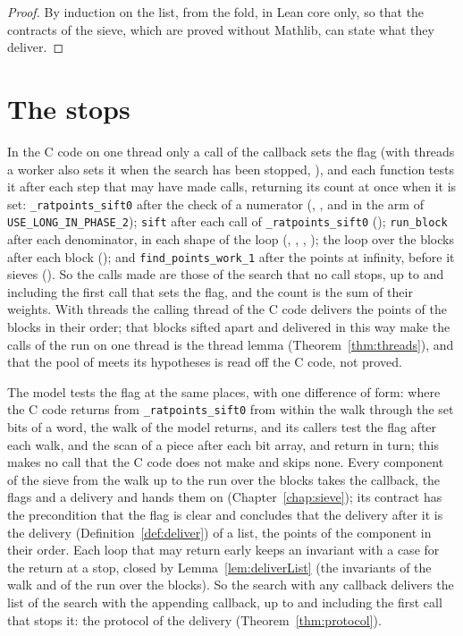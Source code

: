 \begin{proof}
  \leanok
  By induction on the list, from the fold, in Lean core only, so that the contracts of the sieve,
  which are proved without Mathlib, can state what they deliver.
\end{proof}

\section{The stops}\label{sec:outputStops}

In the C code on one thread only a call of the callback sets the flag (with threads a worker also
sets it when the search has been stopped, ), and each function
tests it after each step that may have made calls, returning its count at once when it is set:
\verb|_ratpoints_sift0| after the check of a numerator (,
, and  in the arm of
\verb|USE_LONG_IN_PHASE_2|); \verb|sift| after each call of \verb|_ratpoints_sift0|
(); \verb|run_block| after each denominator, in each shape of the
loop (, ,
, ); the loop over the blocks
after each block (); and \verb|find_points_work_1| after the
points at infinity, before it sieves (). So the calls made are
those of the search that no call stops, up to and including the first call that sets the flag, and
the count is the sum of their weights. With threads the calling thread of the C code delivers the
points of the blocks in their order; that blocks sifted apart and delivered in this way make the
calls of the run on one thread is the thread lemma (Theorem~\ref{thm:threads}), and that the pool
of \ratpoints{} meets its hypotheses is read off the C code, not proved.

The model tests the flag at the same places, with one difference of form: where the C code returns
from \verb|_ratpoints_sift0| from within the walk through the set bits of a word, the walk of the
model returns, and its callers test the flag after each walk, and the scan of a piece after each
bit array, and return in turn; this makes no call that the C code does not make and skips none.
Every component of the sieve from the walk up to the run over the blocks takes the callback, the
flags and a delivery and hands them on (Chapter~\ref{chap:sieve}); its contract has the
precondition that the flag is clear and concludes that the delivery after it is the delivery
(Definition~\ref{def:deliver}) of a list, the points of the component in their order. Each loop
that may return early keeps an invariant with a case for the return at a stop, closed by
Lemma~\ref{lem:deliverList} (the invariants  of the
walk and  of the run over the blocks). So the search
with any callback delivers the list of the search with the appending callback, up to and including
the first call that stops it: the protocol of the delivery (Theorem~\ref{thm:protocol}).

